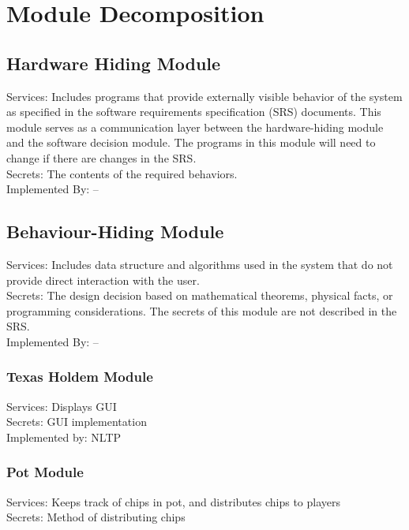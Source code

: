 \documentclass[11pt]{article}
\begin{document}
	\section{Module Decomposition}    
    \subsection{Hardware Hiding Module}
    Services: Includes programs that provide externally visible behavior of the system as specified in the software requirements specification (SRS) documents. This module serves as a communication layer between the hardware-hiding module and the software decision module. The programs in this module will need to change if there are changes in the SRS. \\
    Secrets: The contents of the required behaviors. \\
    Implemented By: –\\
    
    \subsection{Behaviour-Hiding Module}
    Services: Includes data structure and algorithms used in the system that do not provide direct interaction with the user. \\
    Secrets: The design decision based on mathematical theorems, physical facts, or programming considerations. The secrets of this module are not described in the SRS. \\
    Implemented By: –\\
    \subsubsection{Texas Holdem Module}
    Services: Displays GUI\\

    Secrets: GUI implementation\\

    Implemented by: NLTP\\

    \subsubsection{Pot Module}
    Services: Keeps track of chips in pot, and distributes chips to players\\

    Secrets: Method of distributing chips\\ 
\end{document}

